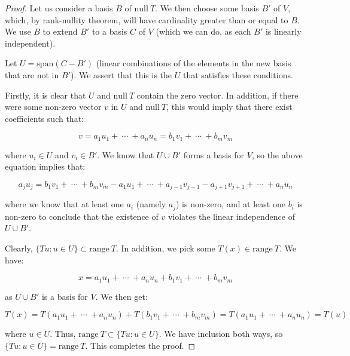 \documentclass[10pt, oneside]{article}
\newcommand{\Null}{\text{null}}
\begin{document}
      \begin{proof}

      Let us consider a basis $B$ of $\Null \ T$. We then choose some basis $B'$ of $V$, which, by rank-nullity theorem, will
      have cardinality greater than or equal to $B$. We use $B$ to extend $B'$ to a basis $C$ of $V$ (which we can do, as each $B'$
      is linearly independent).
      \newline

      Let $U = \text{span}(C - B')$ (linear combinations of
      the elements in the new basis that are not in $B'$). We assert that this is the $U$ that satisfies these
      conditions.
      \newline

      Firstly, it is clear that $U$ and $\text{null} \ T$ contain the zero vector. In addition, if there were some non-zero vector $v$
      in $U$ and $\text{null} \ T$, this would imply that there exist coefficients such that:

      $$v = a_1 u_1 + \ \cdots \ + a_n u_n = b_1 v_1 + \ \cdots \ + b_m v_m$$

      where $u_i \in U$ and $v_i \in B'$. We know that $U \cup B'$ forms a basis for $V$, so the above equation implies that:

      $$a_j u_j = b_1 v_1 + \ \cdots \ + b_m v_m -  a_1 u_1 + \ \cdots \ + a_{j - 1} v_{j - 1} - a_{j + 1} v_{j + 1} + \ \cdots \ + a_n u_n$$

      where we know that at least one $a_i$ (namely $a_j$) is non-zero, and at least one $b_i$ is non-zero to conclude that the existence of
      $v$ violates the linear independence of $U \cup B'$.
      \newline

      Clearly, $\{Tu : u \in U\} \subset \text{range} \ T$. In addition, we pick some $T(x) \in \text{range} \ T$. We have:

      $$x = a_1 u_1 + \ \cdots \ + a_n u_n + b_1 v_1 + \ \cdots \ + b_m v_m$$

      as $U \cup B'$ is a basis for $V$. We then get:

      $$T(x) =  T(a_1 u_1 + \ \cdots \ + a_n u_n) + T(b_1 v_1 + \ \cdots \ + b_m v_m) = T(a_1 u_1 + \ \cdots \ + a_n u_n) = T(u)$$

      where $u \in U$. Thus, $\text{range} \ T \subset \{Tu : u \in U\}$. We have inclusion both ways, so $\{Tu : u \in U\} = \text{range} \ T$.
      This completes the proof.

      \end{proof}
\end{document}
